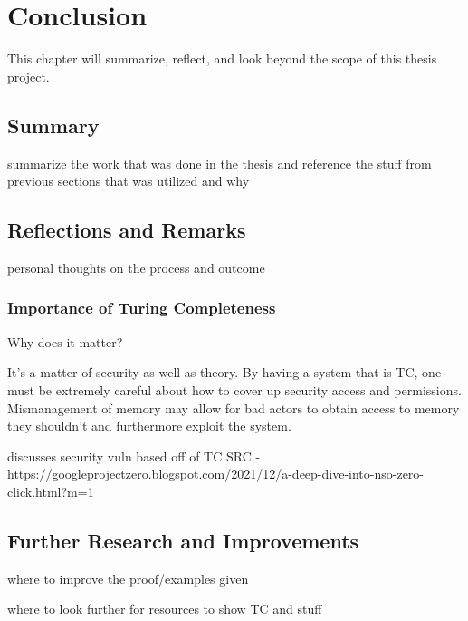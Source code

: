 \chapter{Conclusion}\label{chatper:Concl}

This chapter will summarize, reflect, and look beyond the scope of this thesis project.

\section{Summary}

summarize the work that was done in the thesis and reference the stuff from previous sections that was utilized and why

\section{Reflections and Remarks}

personal thoughts on the process and outcome

\subsection{Importance of Turing Completeness}
Why does it matter?

It's a matter of security as well as theory.
By having a system that is TC, one must be extremely careful about how to cover up security access and permissions.
Mismanagement of memory may allow for bad actors to obtain access to memory they shouldn't and furthermore exploit the system.

discusses security vuln based off of TC
SRC - https://googleprojectzero.blogspot.com/2021/12/a-deep-dive-into-nso-zero-click.html?m=1

\section{Further Research and Improvements}

where to improve the proof/examples given

where to look further for resources to show TC and stuff
